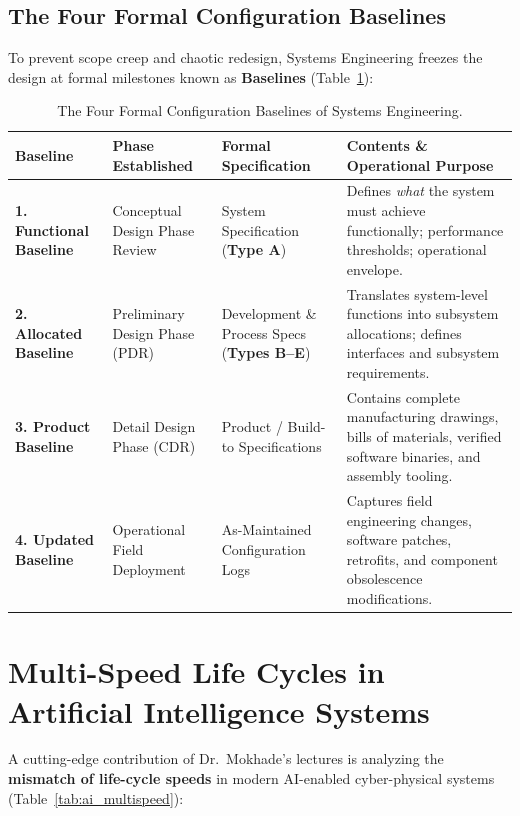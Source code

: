 \subsection{The Four Formal Configuration Baselines}
To prevent scope creep and chaotic redesign, Systems Engineering freezes the design at formal milestones known as \textbf{Baselines} (Table~\ref{tab:four_baselines}):

\begin{table}[htbp]
\centering
\small
\renewcommand{\arraystretch}{1.3}
\begin{tabularx}{\textwidth}{lp{3.5cm}p{4cm}X}
\toprule
\textbf{Baseline} & \textbf{Phase Established} & \textbf{Formal Specification} & \textbf{Contents \& Operational Purpose} \\
\midrule
\textbf{1. Functional Baseline} & Conceptual Design Phase Review & System Specification (\textbf{Type A}) & Defines \textit{what} the system must achieve functionally; performance thresholds; operational envelope. \\
\textbf{2. Allocated Baseline} & Preliminary Design Phase (PDR) & Development \& Process Specs (\textbf{Types B--E}) & Translates system-level functions into subsystem allocations; defines interfaces and subsystem requirements. \\
\textbf{3. Product Baseline} & Detail Design Phase (CDR) & Product / Build-to Specifications & Contains complete manufacturing drawings, bills of materials, verified software binaries, and assembly tooling. \\
\textbf{4. Updated Baseline} & Operational Field Deployment & As-Maintained Configuration Logs & Captures field engineering changes, software patches, retrofits, and component obsolescence modifications. \\
\bottomrule
\end{tabularx}
\caption{The Four Formal Configuration Baselines of Systems Engineering.}
\label{tab:four_baselines}
\end{table}

\section{Multi-Speed Life Cycles in Artificial Intelligence Systems}
\label{sec:ai_multispeed_lc}

A cutting-edge contribution of Dr.~Mokhade's lectures is analyzing the \textbf{mismatch of life-cycle speeds} in modern AI-enabled cyber-physical systems (Table~\ref{tab:ai_multispeed}):

